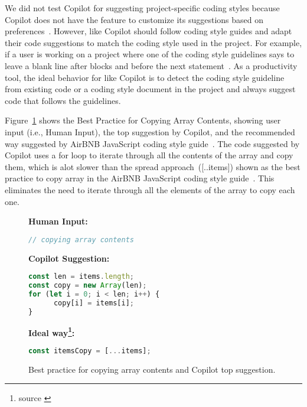 We did not test Copilot for suggesting project-specific coding styles because Copilot does not have the feature to customize its suggestions based on preferences~\cite{Copilot-web}.
However, \cct{} like Copilot should follow coding style guides and adapt their code suggestions to match the coding style used in the project. 
For example, if a user is working on a project where one of the coding style guidelines says to leave a blank line after blocks and before the next statement~\cite{airbnb_code}. As a productivity tool, the ideal behavior for \cct{} like Copilot is to detect the coding style guideline from existing code or a coding style document in the project and always suggest code that follows the guidelines.

Figure~\ref{fig:bp_1} shows the Best Practice for Copying Array Contents, showing user input (i.e., Human Input), the top suggestion by Copilot, and the recommended way suggested by AirBNB JavaScript coding style guide~\cite{airbnb_code}. 
The code suggested by Copilot uses a for loop to iterate through all the contents of the array and copy them, which is alot slower than the spread approach~([..items]) shown as the best practice to copy array in the AirBNB JavaScript coding style guide~\cite{airbnb_code}. This eliminates the need to iterate through all the elements of the array to copy each one. 

\begin{figure}[hbt!]
    \centering
\begin{tcolorbox}[title=Copying Array Contents,boxsep=.15mm]
\textbf{Human Input:}
\begin{lstlisting}[language=JavaScript]
// copying array contents
\end{lstlisting}
\tcbline
\textbf{Copilot Suggestion:}
\begin{lstlisting}[language=JavaScript]
const len = items.length;
const copy = new Array(len);
for (let i = 0; i < len; i++) {
	  copy[i] = items[i];
}
\end{lstlisting}
\tcbline
\textbf{Ideal way\footnote{source \cite{airbnb_code}}:}
\begin{lstlisting}[language=JavaScript]
const itemsCopy = [...items];
\end{lstlisting}
\end{tcolorbox}
    \caption{Best practice for copying array contents and Copilot top suggestion.}
    \label{fig:bp_1}
\end{figure}

